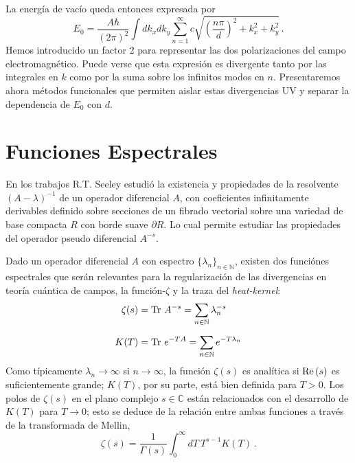 La energía de vacío queda entonces expresada por
\begin{equation}
E _0 = \frac{A \hbar }{(2 \pi) ^2} \int dk _x dk _y 
\sum _{n=1} ^{\infty} 
c
\sqrt{
		\left( \frac{n \pi}{d} \right) ^2 + k _x ^2 + k _y ^2
		}\,.
\end{equation}
Hemos introducido un factor 2 para representar las dos polarizaciones del campo electromagnético. Puede verse que esta expresión es divergente tanto por las integrales en $k$ como por la suma sobre los infinitos modos en $n$. Presentaremos ahora métodos funcionales que permiten aislar estas divergencias UV y separar la dependencia de $E_0$ con $d$.

\section{Funciones Espectrales}

En los trabajos \cite{Seeley:1967ea,10.2307/2373309,10.2307/2373312} R.T. Seeley estudió la existencia y propiedades de la resolvente $(A - \lambda) ^{-1}$ de un operador diferencial $A$, con coeficientes infinitamente derivables definido sobre secciones de un fibrado vectorial sobre una variedad de base compacta $R$ con borde suave $\partial R$. Lo cual permite estudiar las propiedades del operador pseudo diferencial $A ^{-s}$.



Dado un operador diferencial $A$ con espectro $\{ \lambda _n \} _{n \in \mathbb N}$, existen dos funciónes espectrales que serán relevantes para la regularización de las divergencias en teoría cuántica de campos, la función-$\zeta$ y la traza del {\it heat-kernel}:
\begin{align}
\zeta  (s) &= {\rm Tr}\ A ^{-s} = \sum \limits_{n \in \mathbb N}   \lambda _n ^{-s} \label{funcion.zeta}\\[2mm]
K (T) &=  {\rm Tr} \ e ^{-T A} = \sum \limits_{n \in \mathbb N} e ^{-T \lambda _{n} }
\end{align}
Como típicamente $\lambda_n\to \infty$ si $n\to \infty$, la función $\zeta  (s) $ es analítica si ${\rm Re}\,(s)$ es suficientemente grande; $K(T)$, por su parte, está bien definida para $T>0$. Los polos de $\zeta(s)$ en el plano complejo $s\in\mathbb C$ están relacionados con el desarrollo de $K(T)$ para $T\to 0$; esto se deduce de la relación entre ambas funciones a través de la transformada de Mellin,
\begin{equation}
\zeta (s) = \frac{1}{\Gamma (s) } 
\int _0 ^{\infty} dT \
T^{s-1} K(T) \,.
\label{eq.mellin}
\end{equation}

